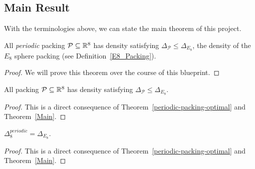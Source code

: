 \subsection{Main Result}

With the terminologies above, we can state the main theorem of this project.

\begin{theorem}\label{Main}
  All \emph{periodic} packing $\mathcal{P} \subseteq \mathbb{R}^8$ has density satisfying $\Delta_{\mathcal{P}} \leq \Delta_{E_8}$, the density of the $E_8$ sphere packing (see Definition~\ref{E8_Packing}).
\end{theorem}
\begin{proof}
  We will prove this theorem over the course of this blueprint.
\end{proof}

\begin{corollary}\label{Main'}
  All packing $\mathcal{P} \subseteq \mathbb{R}^8$ has density satisfying $\Delta_{\mathcal{P}} \leq \Delta_{E_8}$.
\end{corollary}
\begin{proof}
  This is a direct consequence of Theorem~\ref{periodic-packing-optimal} and Theorem~\ref{Main}.
\end{proof}

\begin{corollary}\label{Main'}
  $\Delta_8^{periodic} = \Delta_{E_8}$.
\end{corollary}
\begin{proof}
  This is a direct consequence of Theorem~\ref{periodic-packing-optimal} and Theorem~\ref{Main}.
\end{proof}

